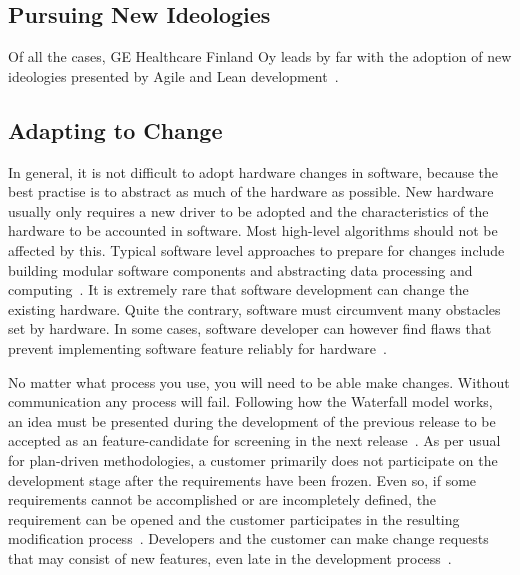 \documentclass[english]{tktltiki2}
\begin{document}
\subsection{Pursuing New Ideologies}

Of all the cases, GE Healthcare Finland Oy leads by far with the adoption of new ideologies presented by Agile and Lean development~\cite{BT15}.

\subsection{Adapting to Change}

In general, it is not difficult to adopt hardware changes in software, because the best practise is to abstract as much of the hardware as possible. New hardware usually only requires a new driver to be adopted and the characteristics of the hardware to be accounted in software. Most high-level algorithms should not be affected by this. Typical software level approaches to prepare for changes include building modular software components and abstracting data processing and computing~\cite{Hol15b, Koi15, Kri15}. It is extremely rare that software development can change the existing hardware. Quite the contrary, software must circumvent many obstacles set by hardware. In some cases, software developer can however find flaws that prevent implementing software feature reliably for hardware~\cite{Hol15b}.

No matter what process you use, you will need to be able make changes. Without communication any process will fail. Following how the Waterfall model works, an idea must be presented during the development of the previous release to be accepted as an feature-candidate for screening in the next release~\cite{Koi15}. As per usual for plan-driven methodologies, a customer primarily does not participate on the development stage after the requirements have been frozen. Even so, if some requirements cannot be accomplished or are incompletely defined, the requirement can be opened and the customer participates in the resulting modification process~\cite{Hol15b, Koi15}. Developers and the customer can make change requests that may consist of new features, even late in the development process~\cite{Koi15}.
\end{document}
